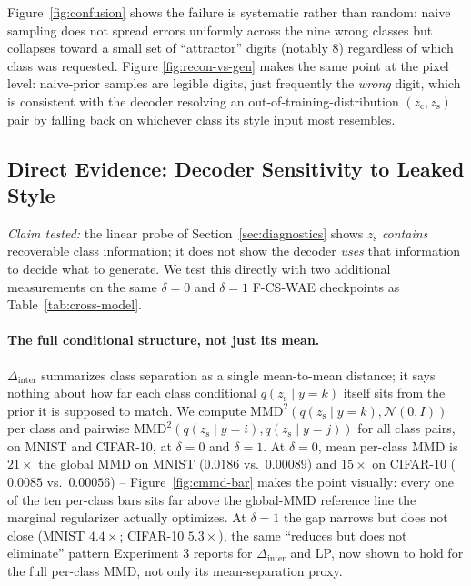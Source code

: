 \documentclass[10pt,letterpaper]{article}
\newcommand{\ours}{F-CS-WAE}
\newcommand{\zc}{z_{\mathrm{c}}}
\newcommand{\zs}{z_{\mathrm{s}}}
\newcommand{\MMD}{\mathrm{MMD}}
\begin{document}
Figure~\ref{fig:confusion} shows the failure is systematic rather than
random: naive sampling does not spread errors uniformly across the nine
wrong classes but collapses toward a small set of ``attractor'' digits
(notably 8) regardless of which class was requested. Figure
\ref{fig:recon-vs-gen} makes the same point at the pixel level: naive-prior
samples are legible digits, just frequently the \emph{wrong} digit, which is
consistent with the decoder resolving an out-of-training-distribution
$(\zc,\zs)$ pair by falling back on whichever class its style input most
resembles.

\subsection{Direct Evidence: Decoder Sensitivity to Leaked Style}
\label{sec:swap}

\emph{Claim tested:} the linear probe of Section~\ref{sec:diagnostics} shows
$\zs$ \emph{contains} recoverable class information; it does not show the
decoder \emph{uses} that information to decide what to generate. We test
this directly with two additional measurements on the same $\delta{=}0$ and
$\delta{=}1$ \ours{} checkpoints as Table~\ref{tab:cross-model}.

\paragraph{The full conditional structure, not just its mean.}
$\Delta_{\mathrm{inter}}$ summarizes class separation as a single
mean-to-mean distance; it says nothing about how far each class conditional
$q(\zs\mid y{=}k)$ itself sits from the prior it is supposed to match. We
compute $\MMD^2(q(\zs\mid y{=}k),\mathcal N(0,I))$ per class and pairwise
$\MMD^2(q(\zs\mid y{=}i),q(\zs\mid y{=}j))$ for all class pairs, on MNIST and
CIFAR-10, at $\delta{=}0$ and $\delta{=}1$. At $\delta{=}0$, mean per-class
MMD is $21\times$ the global MMD on MNIST ($0.0186$ vs.\ $0.00089$) and
$15\times$ on CIFAR-10 ($0.0085$ vs.\ $0.00056$) -- Figure~\ref{fig:cmmd-bar}
makes the point visually: every one of the ten per-class bars sits far above
the global-MMD reference line the marginal regularizer actually optimizes.
At $\delta{=}1$ the gap narrows but does not close (MNIST $4.4\times$;
CIFAR-10 $5.3\times$), the same ``reduces but does not eliminate'' pattern
Experiment 3 reports for $\Delta_{\mathrm{inter}}$ and LP, now shown to hold
for the full per-class MMD, not only its mean-separation proxy.
\end{document}

